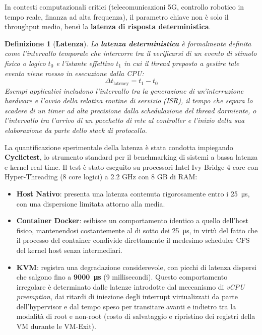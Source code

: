 \documentclass[11pt, a4paper]{article}
\newtheorem{theorem}{Definizione}
\begin{document}
In contesti computazionali critici (telecomunicazioni 5G, controllo robotico in tempo reale, finanza ad alta frequenza), il parametro chiave non è solo il throughput medio, bensì la \textbf{latenza di risposta deterministica}.

\begin{theorem}[\textbf{Latenza}]
La \textbf{latenza deterministica} è formalmente definita come l'intervallo temporale che intercorre tra il verificarsi di un evento di stimolo fisico o logico $t_0$ e l'istante effettivo $t_1$ in cui il thread preposto a gestire tale evento viene messo in esecuzione dalla CPU:
\[
    \Delta t_{\text{latency}} = t_1 - t_0
\]
Esempi applicativi includono l'intervallo tra la generazione di un'interruzione hardware e l'avvio della relativa routine di servizio (ISR), il tempo che separa lo scadere di un timer ad alta precisione dalla schedulazione del thread dormiente, o l'intervallo tra l'arrivo di un pacchetto di rete al controller e l'inizio della sua elaborazione da parte dello stack di protocollo.
\end{theorem}


La quantificazione sperimentale della latenza è stata condotta impiegando \textbf{Cyclictest}, lo strumento standard per il benchmarking di sistemi a bassa latenza e kernel real-time. Il test è stato eseguito su processori Intel Ivy Bridge 4 core con Hyper-Threading (8 core logici) a 2.2 GHz con 8 GB di RAM:
\begin{itemize}
    \item \textbf{Host Nativo}: presenta una latenza contenuta rigorosamente entro i \SI{25}{\micro\second}, con una dispersione limitata attorno alla media.
    \item \textbf{Container Docker}: esibisce un comportamento identico a quello dell'host fisico, mantenendosi costantemente al di sotto dei \SI{25}{\micro\second}, in virtù del fatto che il processo del container condivide direttamente il medesimo scheduler CFS del kernel host senza intermediari.
    \item \textbf{KVM}: registra una degradazione considerevole, con picchi di latenza dispersi che salgono fino a \textbf{\SI{9000}{\micro\second}} (9 millisecondi). Questo comportamento irregolare è determinato dalle latenze introdotte dal meccanismo di \emph{vCPU preemption}, dai ritardi di iniezione degli interrupt virtualizzati da parte dell'hypervisor e dal tempo speso per transitare avanti e indietro tra la modalità di root e non-root (costo di salvataggio e ripristino dei registri della VM durante le VM-Exit).
\end{itemize}
\end{document}
